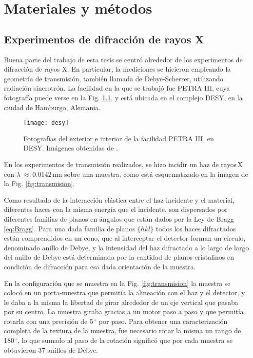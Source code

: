 \chapter{Materiales y métodos}\label{C:Materiales}
\graphicspath{{./figs/02_Mat/}}
\section{Experimentos de difracción de rayos X}\label{S:MatXRD}
Buena parte del trabajo de esta tesis se centró alrededor de los experimentos de difracción de rayos X.
En particular, la mediciones se hicieron empleando la geometría de transmisión, también llamada de Debye-Scherrer, utilizando radiación sincrotrón.
La facilidad en la que se trabajó fue PETRA III, cuya fotografía puede verse en la Fig. \ref{fig:desyfoto}, y está ubicada en el complejo DESY, en la ciudad de Hamburgo, Alemania\cite{desy}.

\begin{figure}[!htb] 
  \centering
  \texttt{[image: desy]}
  \caption{Fotografías del exterior e interior de la facilidad PETRA III, en DESY. Imágenes obtenidas de \cite{desy}.}
  \label{fig:desyfoto}
\end{figure}

En los experimentos de transmisión realizados, se hizo incidir un haz de rayos\,X con $\lambda \ \approx \ 0.0142$\,nm sobre una muestra, como está esquematizado en la imagen de la Fig. \ref{fig:transmision}. 

Como resultado de la interacción elástica entre el haz incidente y el material, diferentes haces con la misma energía que el incidente, son dispersados por diferentes familias de planos en ángulos que están dados por la Ley de Bragg \ref{eq:Bragg}.
Para una dada familia de planos $\{hkl\}$ todos los haces difractados están comprendidos en un cono, que al interceptar el detector forman un círculo, denominado anillo de Debye, y la intensidad del haz difractado a lo largo de largo del anillo de Debye está determinada por la cantidad de planos cristalinos en condición de difracción para esa dada orientación de la muestra.

En la configuración que se muestra en la Fig. \ref{fig:transmision} la muestra se colocó en un porta-muestra que permitía la alineación con el haz y el detector, y le daba a la misma la libertad de girar alrededor de un eje vertical que pasaba por su centro.
La muestra giraba gracias a un motor paso a paso y que permitía rotarla con una precisión de 5\,$^{\circ}$ por paso.
Para obtener una caracterización completa de la textura de la muestra, fue necesario rotar la misma un rango de 180\,$^{\circ}$, lo que sumado al paso de la rotación significó que por cada muestra se obtuvieron 37 anillos de Debye.

